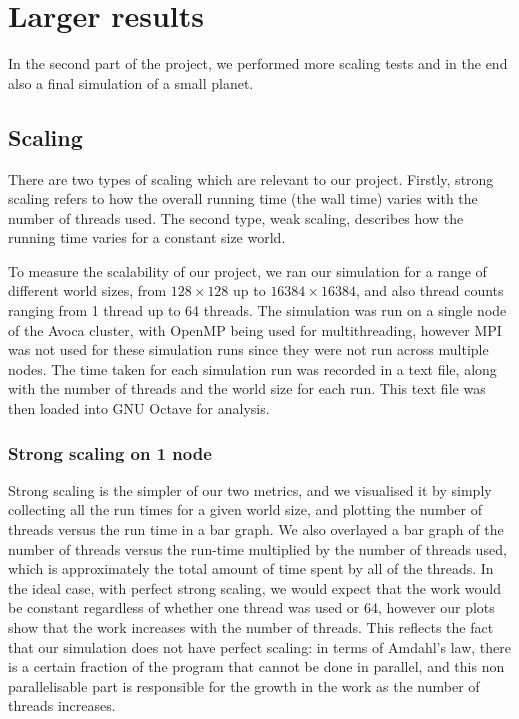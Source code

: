 \documentclass[a4paper]{article}
\begin{document}
\section{Larger results}

In the second part of the project, we performed more scaling tests and in the end also a final simulation of a small planet.

\subsection{Scaling}

There are two types of scaling which are relevant to our project.
Firstly, strong scaling refers to how the overall running time (the wall time) varies with the number of threads used.
The second type, weak scaling, describes how the running time varies for a constant size world.

To measure the scalability of our project, we ran our simulation for a range of different world sizes, from $128 \times 128$ up to $16384 \times 16384$, and also thread counts ranging from 1 thread up to 64 threads.
The simulation was run on a single node of the Avoca cluster, with OpenMP being used for multithreading, however MPI was not used for these simulation runs since they were not run across multiple nodes.
The time taken for each simulation run was recorded in a text file, along with the number of threads and the world size for each run.
This text file was then loaded into GNU Octave for analysis.

\subsubsection{Strong scaling on 1 node}

Strong scaling is the simpler of our two metrics, and we visualised it by simply collecting all the run times for a given world size, and plotting the number of threads versus the run time in a bar graph.
We also overlayed a bar graph of the number of threads versus the run-time multiplied by the number of threads used, which is approximately the total amount of time spent by all of the threads.
In the ideal case, with perfect strong scaling, we would expect that the work would be constant regardless of whether one thread was used or 64, however our plots show that the work increases with the number of threads.
This reflects the fact that our simulation does not have perfect scaling: in terms of Amdahl's law, there is a certain fraction of the program that cannot be done in parallel, and this non parallelisable part is responsible for the growth in the work as the number of threads increases.
\end{document}
